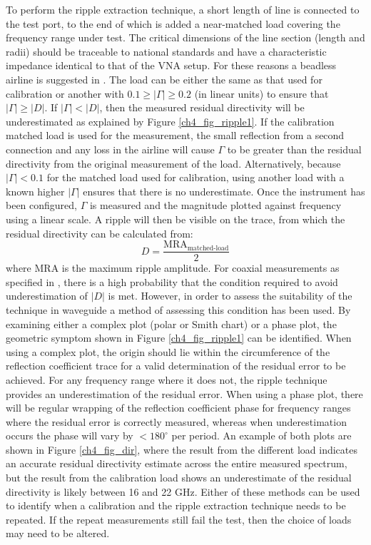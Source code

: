 \documentclass[../thesis/thesis.tex]{subfiles}
\begin{document}
To perform the ripple extraction technique, a short length of line is connected to the test port, to the end of which is added a near-matched load covering the frequency range under test. The critical dimensions of the line section (length and radii) should be traceable to national standards and have a characteristic impedance
identical to that of the VNA setup. For these reasons a beadless airline is suggested in \cite{EURAMET_2011}. The load can be either the same as that used for calibration or another with $0.1 \ge |\Gamma| \ge 0.2$ (in linear units) to ensure that $|\Gamma| \ge |D|$. If $|\Gamma| < |D|$, then the measured residual directivity will be underestimated as explained by Figure \ref{ch4_fig_ripple1}. If the calibration matched load is used for the measurement, the small reflection from a second connection and any loss in the airline will cause $\Gamma$ to be greater than the residual directivity from the original measurement of the load. Alternatively, because $|\Gamma| < 0.1$ for the matched load used for calibration, using another load with a known higher $|\Gamma|$ ensures that there is no underestimate. Once the instrument has been configured, $\Gamma$ is measured and the magnitude plotted against frequency using a linear scale. A ripple will then be visible on the trace, from which the residual directivity can be calculated from:
\begin{equation}
D = \frac{\textrm{MRA}_\textrm{matched-load}}{2}
\end{equation}
where $\textrm{MRA}$ is the maximum ripple amplitude.
For coaxial measurements as specified in \cite{EURAMET_2011}, there is a high probability that the condition required to avoid underestimation of $|D|$ is met. However, in order to assess the suitability of the technique in waveguide a method of assessing this condition has been used. By examining either a complex plot (polar or Smith chart) or a phase plot, the geometric symptom shown in Figure \ref{ch4_fig_ripple1} can be identified. When using a complex plot, the origin should lie within the circumference of the reflection coefficient trace for a valid determination of the residual error to be achieved. For any frequency range where it does not, the ripple technique provides an underestimation of the residual error. When using a phase plot, there will be regular wrapping of the reflection coefficient phase for frequency ranges where the residual error is correctly measured, whereas when underestimation occurs the phase will vary by $<180^\circ$ per period. An example of both plots are shown in Figure \ref{ch4_fig_dir}, where the result from the different load indicates an accurate residual directivity estimate across the entire measured spectrum, but the result from the calibration load shows an underestimate of the residual directivity is likely between 16 and 22 GHz. Either of these methods can be used to identify when a calibration and the ripple extraction technique needs to be repeated. If the repeat measurements still fail the test, then the choice of loads may need to be altered. 
\end{document}
